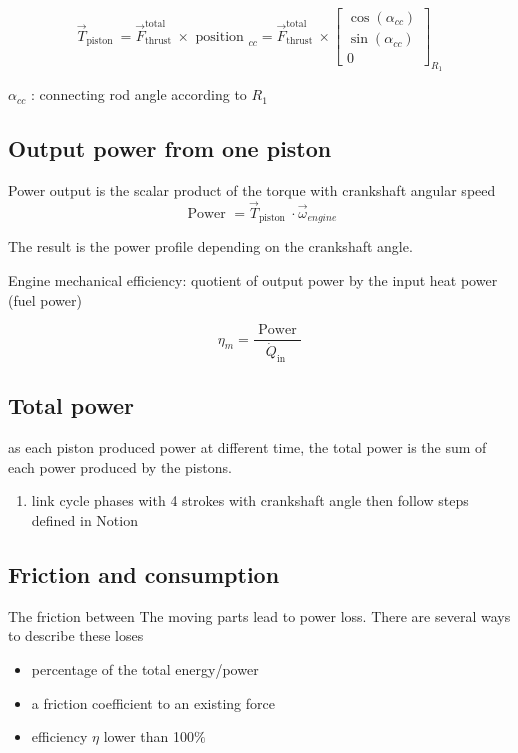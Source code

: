 \documentclass[12pt,a4paper]{article}
\begin{document}
		\[
		\vec{T}_{\text {piston }}=\vec{F}_{\text {thrust }}^{\text {total }} \times \text { position }_{c c}=\vec{F}_{\text {thrust }}^{\text {total }} \times\left[\begin{array}{c}
			\cos \left(\alpha_{c c}\right)  \tag{7}\\
			\sin \left(\alpha_{c c}\right) \\
			0
		\end{array}\right]_{R_{1}}
		\]
		
		$\alpha_{c c}$ : connecting rod angle according to $R_{1}$\\
	\subsection{Output power from one piston}
	Power output is the scalar product of the torque with crankshaft angular speed
	\begin{equation*}
		\text { Power }=\vec{T}_{\text {piston }} \cdot \vec{\omega}_{engine} \tag{8}
	\end{equation*}
	
	The result is the power profile depending on the crankshaft angle.
		
	Engine mechanical efficiency: quotient of output power by the input heat power (fuel power)
		
	\begin{equation*}
		\eta_{m}=\frac{\text { Power }}{\dot{Q}_{\text {in }}} \tag{9}
	\end{equation*}
	\subsection{Total power}
	as each piston produced power at different time, the total power is the sum of each power produced by the pistons. 
	
	\begin{enumerate}
		\item link cycle phases with 4 strokes with crankshaft angle then follow steps defined in Notion
	\end{enumerate}
	
	\subsection{Friction and consumption}
	The friction between The moving parts lead to power loss. 
	There are several ways to describe these loses 
	\begin{itemize}
		\item percentage of the total energy/power
		\item a friction coefficient to an existing force
		\item efficiency $\eta$ lower than 100$\%$
	\end{itemize}
	
\end{document}
